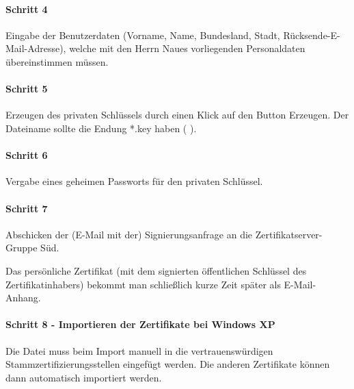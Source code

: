 \paragraph{Schritt 4}

Eingabe der Benutzerdaten (Vorname, Name, Bundesland, Stadt,
Rücksende-E-Mail-Adresse), welche mit den Herrn Naues vorliegenden Personaldaten
übereinstimmen müssen.

\paragraph{Schritt 5}

Erzeugen des privaten Schlüssels durch einen Klick auf den Button \glqq{}Erzeugen\grqq{}.
Der Dateiname sollte die Endung *.key haben (\zB{} ).

\paragraph{Schritt 6}

Vergabe eines geheimen Passworts für den privaten Schlüssel.

\paragraph{Schritt 7}

Abschicken der (E-Mail mit der) Signierungsanfrage an die
Zertifikatserver-Gruppe Süd.

Das persönliche Zertifikat (mit dem signierten öffentlichen Schlüssel des
Zertifikatinhabers) bekommt man schließlich kurze Zeit später als E-Mail-Anhang.

\paragraph{Schritt 8 - Importieren der Zertifikate bei Windows XP}

Die Datei  muss beim Import manuell in die
vertrauenswürdigen Stammzertifizierungsstellen eingefügt werden. Die anderen
Zertifikate können dann automatisch importiert werden.

